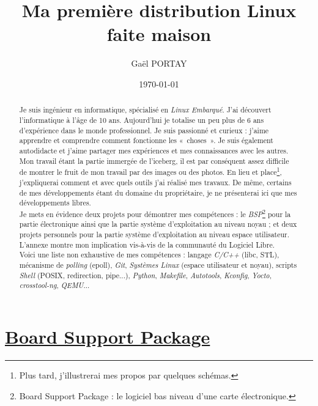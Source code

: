 \documentclass[a4paper]{article}
\title{Ma première distribution Linux faite maison}
\author{Gaël PORTAY}
\date{\today}
\begin{document}
\sloppy
\maketitle

\begin{abstract}
Je suis ingénieur en informatique, spécialisé en \textit{Linux Embarqué}. J'ai découvert l'informatique à l'âge de 10 ans. Aujourd'hui je totalise un peu plus de 6 ans d’expérience dans le monde professionnel. Je suis passionné et curieux : j'aime apprendre et comprendre comment fonctionne les «~choses~». Je suis également autodidacte et j'aime partager mes expériences et mes connaissances avec les autres.\\

Mon travail étant la partie immergée de l'iceberg, il est par conséquent assez difficile de montrer le fruit de mon travail par des images ou des photos. En lieu et place\footnote{Plus tard, j'illustrerai mes propos par quelques schémas.}, j'expliquerai comment et avec quels outils j'ai réalisé mes travaux. De même, certains de mes développements étant du domaine du propriétaire, je ne présenterai ici que mes développements libres.\\

Je mets en évidence deux projets pour démontrer mes compétences : le \textit{BSP}\footnote{Board Support Package : le logiciel bas niveau d'une carte électronique.} pour la partie électronique ainsi que la partie système d'exploitation au niveau noyau ; et deux projets personnels pour la partie système d'exploitation au niveau espace utilisateur. L'annexe montre mon implication vis-à-vis de la communauté du Logiciel Libre.\\

Voici une liste non exhaustive de mes compétences : langage \textit{C/C++} (libc, STL), mécanisme de \textit{polling} (epoll), \textit{Git}, \textit{Systèmes Linux} (espace utilisateur et noyau), scripts \textit{Shell} (POSIX, redirection, pipe...), \textit{Python}, \textit{Makefile}, \textit{Autotools}, \textit{Kconfig}, \textit{Yocto}, \textit{crosstool-ng}, \textit{QEMU}...
\end{abstract}

\clearpage
\tableofcontents

\clearpage
\part{\href{https://fr.wikipedia.org/wiki/Board_support_package}{Board Support Package}}
\end{document}
